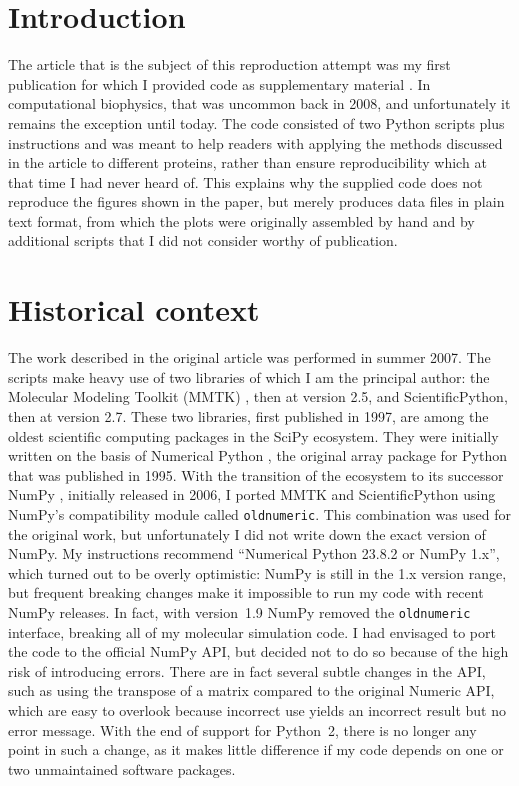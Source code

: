 \section*{Introduction}

The article that is the subject of this reproduction attempt was my first publication for which I provided code as supplementary material \cite{HinsenStructuralflexibilityproteins2008}. In computational biophysics, that was uncommon back in 2008, and unfortunately it remains the exception until today. The code consisted of two Python scripts plus instructions and was meant to help readers with applying the methods discussed in the article to different proteins, rather than ensure reproducibility which at that time I had never heard of. This explains why the supplied code does not reproduce the figures shown in the paper, but merely produces data files in plain text format, from which the plots were originally assembled by hand and by additional scripts that I did not consider worthy of publication.

\section*{Historical context}

The work described in the original article was performed in summer 2007. The scripts make heavy use of two libraries of which I am the principal author: the Molecular Modeling Toolkit (MMTK) \cite{Hinsenmolecularmodelingtoolkit2000}, then at version 2.5, and ScientificPython, then at version 2.7. These two libraries, first published in 1997, are among the oldest scientific computing packages in the SciPy ecosystem. They were initially written on the basis of Numerical Python \cite{DuboisNumericalPython1996}, the original array package for Python that was published in 1995. With the transition of the ecosystem to its successor NumPy \cite{OliphantguideNumPy2006}, initially released in 2006, I ported MMTK and ScientificPython using NumPy's compatibility module called \texttt{oldnumeric}. This combination was used for the original work, but unfortunately I did not write down the exact version of NumPy. My instructions recommend ``Numerical Python 23.8.2 or NumPy 1.x'', which turned out to be overly optimistic: NumPy is still in the 1.x version range, but frequent breaking changes make it impossible to run my code with recent NumPy releases. In fact, with version~1.9 NumPy removed the \texttt{oldnumeric} interface, breaking all of my molecular simulation code. I had envisaged to port the code to the official NumPy API, but decided not to do so because of the high risk of introducing errors. There are in fact several subtle changes in the API, such as using the transpose of a matrix compared to the original Numeric API, which are easy to overlook because incorrect use yields an incorrect result but no error message. With the end of support for Python~2, there is no longer any point in such a change, as it makes little difference if my code depends on one or two unmaintained software packages.

